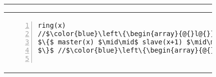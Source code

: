 \begin{figure}
\centering
\noindent\hrule\vspace{10pt}
\vspace{-3ex}
\begin{tabular}{@{} l @{\hspace{4ex}} l@{}}
{\begin{lstlisting}[numbers=left,numbersep=5pt]
ring(x)
//$\color{blue}\left\{\begin{array}{@{}l@{}}\tx{x}|-< x * [\token m_{x,2}] * [\token s_{x{+}1}] * [\token s_{x{+}2}]*\null\\ \shared{\begin{array}{@{}l@{}}\tx{n}|-<n * x|->0 * x{+}1|->0 * x{+}2|->0\end{array}}{I}\end{array} \right\}$
$\{$ master(x) $\mid\mid$ slave(x+1) $\mid\mid$ slave(x+2);
$\}$ //$\color{blue}\left\{\begin{array}{@{}l@{}}\tx{x}|-< x * [\token m_{x,2}] * [\token s_{x{+}1}] * [\token s_{x{+}2}]*\null\\ \shared{\begin{array}{@{}l@{}}\tx{n}|-<n * x|->10 * x{+}1|->10 * x{+}2|->10\end{array}}{I}\end{array} \right\}$


\end{lstlisting}}
\end{tabular}
\end{figure}
